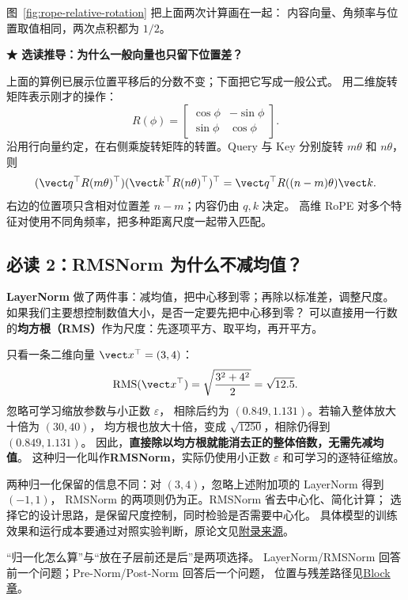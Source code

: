 图~\ref{fig:rope-relative-rotation} 把上面两次计算画在一起：
内容向量、角频率与位置取值相同，两次点积都为 $1/2$。


\noindent\textbf{\texorpdfstring{{\symboliconfont ★}}{★} 选读推导：为什么一般向量也只留下位置差？}\par
上面的算例已展示位置平移后的分数不变；下面把它写成一般公式。
用二维旋转矩阵表示刚才的操作：
\[
R(\phi)=\begin{bmatrix}\cos\phi&-\sin\phi\\\sin\phi&\cos\phi\end{bmatrix}.
\]
沿用行向量约定，在右侧乘旋转矩阵的转置。Query 与 Key 分别旋转 $m\theta$ 和 $n\theta$，则
\begin{equation}
(\vect q^\top R(m\theta)^\top)
(\vect k^\top R(n\theta)^\top)^\top
=\vect q^\top R((n-m)\theta)\vect k.
\label{eq:rope-relative}
\end{equation}
右边的位置项只含相对位置差 $n-m$；内容仍由 $q,k$ 决定。
高维 RoPE 对多个特征对使用不同角频率，把多种距离尺度一起带入匹配。

\subsection{必读 2：RMSNorm 为什么不减均值？}
\label{sec:modern-rmsnorm}
\label{concept:rmsnorm}

\textbf{LayerNorm} 做了两件事：减均值，把中心移到零；再除以标准差，调整尺度。
如果我们主要想控制数值大小，是否一定要先把中心移到零？
可以直接用一行数的\textbf{均方根（RMS）}作为尺度：先逐项平方、取平均，再开平方。

只看一条二维向量 $\vect x^\top=(3,4)$：
\[
\operatorname{RMS}(\vect x^\top)
=\sqrt{\frac{3^2+4^2}{2}}=\sqrt{12.5}.
\]
忽略可学习缩放参数与小正数 $\varepsilon$，
相除后约为 $(0.849,1.131)$。若输入整体放大十倍为 $(30,40)$，
均方根也放大十倍，变成 $\sqrt{1250}$，相除仍得到 $(0.849,1.131)$。
因此，\textbf{直接除以均方根就能消去正的整体倍数，无需先减均值}。
这种归一化叫作\textbf{RMSNorm}，实际仍使用小正数 $\varepsilon$ 和可学习的逐特征缩放。

两种归一化保留的信息不同：对 $(3,4)$，忽略上述附加项的 LayerNorm 得到 $(-1,1)$，
RMSNorm 的两项则仍为正。RMSNorm 省去中心化、简化计算；
选择它的设计思路，是保留尺度控制，同时检验是否需要中心化。
具体模型的训练效果和运行成本要通过对照实验判断，原论文见\hyperref[source:rmsnorm]{附录来源}。


“归一化怎么算”与“放在子层前还是后”是两项选择。
LayerNorm/RMSNorm 回答前一个问题；Pre-Norm/Post-Norm 回答后一个问题，
位置与残差路径见\hyperref[intro:22-transformer-architecture]{Block 章}。


